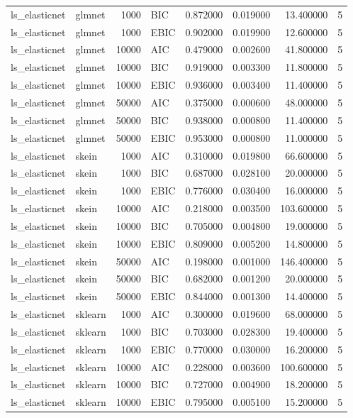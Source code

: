 \begin{table}[t]
\begin{tabular}{llrlrrrr}
ls_elasticnet & glmnet & 1000 & BIC & 0.872000 & 0.019000 & 13.400000 & 5 \\
ls_elasticnet & glmnet & 1000 & EBIC & 0.902000 & 0.019900 & 12.600000 & 5 \\
ls_elasticnet & glmnet & 10000 & AIC & 0.479000 & 0.002600 & 41.800000 & 5 \\
ls_elasticnet & glmnet & 10000 & BIC & 0.919000 & 0.003300 & 11.800000 & 5 \\
ls_elasticnet & glmnet & 10000 & EBIC & 0.936000 & 0.003400 & 11.400000 & 5 \\
ls_elasticnet & glmnet & 50000 & AIC & 0.375000 & 0.000600 & 48.000000 & 5 \\
ls_elasticnet & glmnet & 50000 & BIC & 0.938000 & 0.000800 & 11.400000 & 5 \\
ls_elasticnet & glmnet & 50000 & EBIC & 0.953000 & 0.000800 & 11.000000 & 5 \\
ls_elasticnet & skein & 1000 & AIC & 0.310000 & 0.019800 & 66.600000 & 5 \\
ls_elasticnet & skein & 1000 & BIC & 0.687000 & 0.028100 & 20.000000 & 5 \\
ls_elasticnet & skein & 1000 & EBIC & 0.776000 & 0.030400 & 16.000000 & 5 \\
ls_elasticnet & skein & 10000 & AIC & 0.218000 & 0.003500 & 103.600000 & 5 \\
ls_elasticnet & skein & 10000 & BIC & 0.705000 & 0.004800 & 19.000000 & 5 \\
ls_elasticnet & skein & 10000 & EBIC & 0.809000 & 0.005200 & 14.800000 & 5 \\
ls_elasticnet & skein & 50000 & AIC & 0.198000 & 0.001000 & 146.400000 & 5 \\
ls_elasticnet & skein & 50000 & BIC & 0.682000 & 0.001200 & 20.000000 & 5 \\
ls_elasticnet & skein & 50000 & EBIC & 0.844000 & 0.001300 & 14.400000 & 5 \\
ls_elasticnet & sklearn & 1000 & AIC & 0.300000 & 0.019600 & 68.000000 & 5 \\
ls_elasticnet & sklearn & 1000 & BIC & 0.703000 & 0.028300 & 19.400000 & 5 \\
ls_elasticnet & sklearn & 1000 & EBIC & 0.770000 & 0.030000 & 16.200000 & 5 \\
ls_elasticnet & sklearn & 10000 & AIC & 0.228000 & 0.003600 & 100.600000 & 5 \\
ls_elasticnet & sklearn & 10000 & BIC & 0.727000 & 0.004900 & 18.200000 & 5 \\
ls_elasticnet & sklearn & 10000 & EBIC & 0.795000 & 0.005100 & 15.200000 & 5 \\

\end{tabular}
\end{table}
